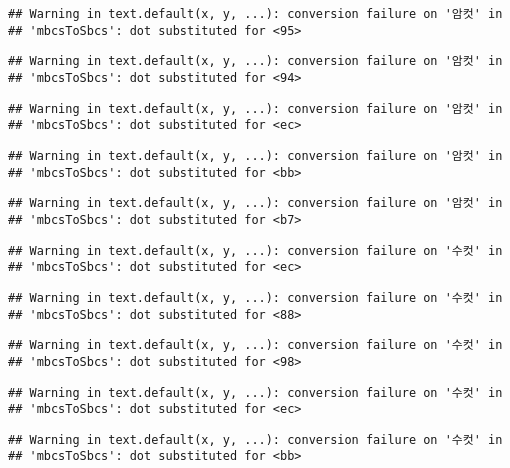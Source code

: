\documentclass[
]{article}
\begin{document}
\begin{verbatim}
## Warning in text.default(x, y, ...): conversion failure on '암컷' in
## 'mbcsToSbcs': dot substituted for <95>
\end{verbatim}

\begin{verbatim}
## Warning in text.default(x, y, ...): conversion failure on '암컷' in
## 'mbcsToSbcs': dot substituted for <94>
\end{verbatim}

\begin{verbatim}
## Warning in text.default(x, y, ...): conversion failure on '암컷' in
## 'mbcsToSbcs': dot substituted for <ec>
\end{verbatim}

\begin{verbatim}
## Warning in text.default(x, y, ...): conversion failure on '암컷' in
## 'mbcsToSbcs': dot substituted for <bb>
\end{verbatim}

\begin{verbatim}
## Warning in text.default(x, y, ...): conversion failure on '암컷' in
## 'mbcsToSbcs': dot substituted for <b7>
\end{verbatim}

\begin{verbatim}
## Warning in text.default(x, y, ...): conversion failure on '수컷' in
## 'mbcsToSbcs': dot substituted for <ec>
\end{verbatim}

\begin{verbatim}
## Warning in text.default(x, y, ...): conversion failure on '수컷' in
## 'mbcsToSbcs': dot substituted for <88>
\end{verbatim}

\begin{verbatim}
## Warning in text.default(x, y, ...): conversion failure on '수컷' in
## 'mbcsToSbcs': dot substituted for <98>
\end{verbatim}

\begin{verbatim}
## Warning in text.default(x, y, ...): conversion failure on '수컷' in
## 'mbcsToSbcs': dot substituted for <ec>
\end{verbatim}

\begin{verbatim}
## Warning in text.default(x, y, ...): conversion failure on '수컷' in
## 'mbcsToSbcs': dot substituted for <bb>
\end{verbatim}
\end{document}
